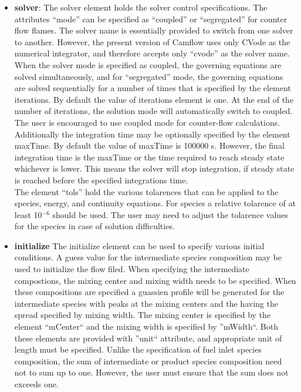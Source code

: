 \begin{itemize}
\item \textbf{solver}: The solver element holds the solver control specifications. The attributes ``mode'' can be specified as ``coupled'' or ``segregated'' for counter flow flames. The solver name is essentially provided to switch from one solver to another. However, the present version of Camflow uses only CVode as the numerical integrator, and therefore accepts only ``cvode'' as the solver name. When the solver mode is specified as coupled, the governing equations are solved simultaneously, and for ``segregated'' mode, the governing equations are solved sequentially for a number of times that is specified by the element iterations. By default the value of iterations element is one. At the end of the number of iterations, the solution mode will automatically switch to coupled. The user is encouraged to use coupled mode for counter-flow calculations.\\

Additionally the integration time may be optionally specified by the element maxTime. By default the value of maxTime is 100000 s. However, the final integration time is the maxTime or the time required to reach steady state whichever is lower. This means the solver will stop integration, if steady state is reached before the specified integrations time.\\

The element ``tols'' hold the various tolarences that can be applied to the species, energy, and continuity equations. For species a relative tolarence of at least 10$^{-6}$ should be used. The user may need to adjust the tolarence values for the species in case of solution difficulties.

\item \textbf{initialize} The initialize element can be used to specify various initial conditions. 
A guess value for the intermediate species composition may be used to initialize the flow filed. When specifying the intermediate compostions, the mixing center and mixing width needs to be specified. When these compositions are specified a guassien profile will be generated for the intermediate species with peaks at the mixing centers and the having the spread specified by mixing width. The mixing center is specified by the element ``mCenter`` and the mixing width is specified by ''mWidth``. Both these elements are provided with ''unit`` attribute, and appropriate unit of length must be specified. Unlike the specification of fuel inlet species composition, the sum of intermediate or product species composition need not to sum up to one. However, the user must ensure that the sum does not exceeds one.\\


\end{itemize}
